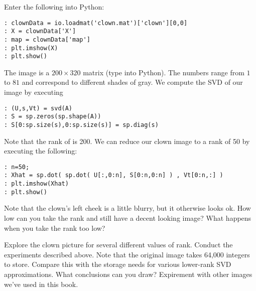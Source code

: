 \begin{python}
Enter the following into Python:
\begin{lstlisting}
: clownData = io.loadmat('clown.mat')['clown'][0,0]
: X = clownData['X']
: map = clownData['map']
: plt.imshow(X)
: plt.show()
\end{lstlisting}
The image  is a $200\times 320$ matrix (type 
into Python).  The numbers range from $1$ to $81$ and
correspond to different shades of gray.  We compute the SVD of our
image  by executing
\begin{lstlisting}
: (U,s,Vt) = svd(A)
: S = sp.zeros(sp.shape(A))
: S[0:sp.size(s),0:sp.size(s)] = sp.diag(s)
\end{lstlisting}
Note that the rank of  is 200.  We can reduce our clown image
to a rank of 50 by executing the following:
\begin{lstlisting}
: n=50;
: Xhat = sp.dot( sp.dot( U[:,0:n], S[0:n,0:n] ) , Vt[0:n,:] )
: plt.imshow(Xhat)
: plt.show()
\end{lstlisting}
Note that the clown's left cheek is a little blurry, but it
otherwise looks ok.  How low can you take the rank and still have a
decent looking image?  What happens when you take the rank too low?

\begin{problem}
Explore the clown picture for several different values of rank.
Conduct the experiments described above.  Note that the original
image takes 64,000 integers to store.  Compare this with the storage
needs for various lower-rank SVD approximations. What conclusions
can you draw? Expirement with other images we've used in this book.
\end{problem}
\end{python}
